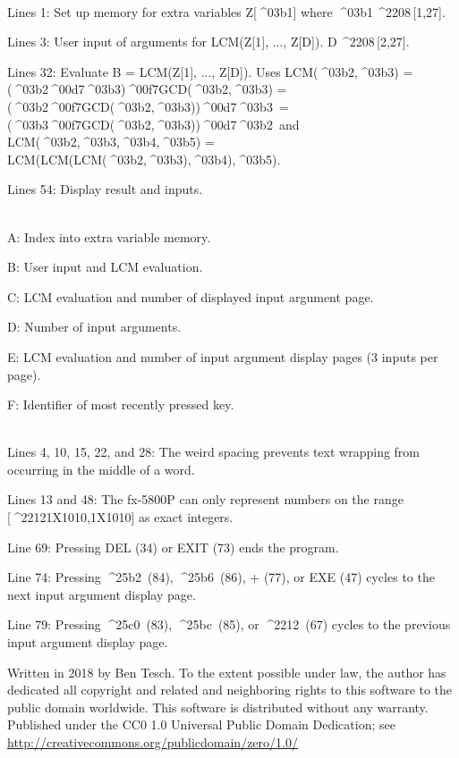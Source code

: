 \documentclass[11pt,letterpaper,twocolumn]{article}
\newcommand{\MUL}{^^^^00d7}
\newcommand{\DIV}{^^^^00f7}
\newcommand{\MINUS}{^^^^2212}
\newcommand{\EXPTEN}{{\scriptsize X10}}
\newcommand{\ELEM}{^^^^2208}
\newcommand{\ALPHA}{^^^^03b1}
\newcommand{\BETA}{^^^^03b2}
\newcommand{\GAMMA}{^^^^03b3}
\newcommand{\DELTA}{^^^^03b4}
\newcommand{\EPSILON}{^^^^03b5}
\newcommand{\UPTRIANG}{^^^^25b2}
\newcommand{\RIGHTTRIANG}{^^^^25b6}
\newcommand{\DOWNTRIANG}{^^^^25bc}
\newcommand{\LEFTTRIANG}{^^^^25c0}
\begin{document}
\\
Lines 1: Set up memory for extra variables Z[\ALPHA] where \ALPHA\,\ELEM \,[1,27].

Lines 3: User input of arguments for LCM(Z[1], ..., Z[D]). D\,\ELEM \,[2,27].

Lines 32: Evaluate B = LCM(Z[1], ..., Z[D]). Uses LCM(\BETA,\GAMMA) = (\BETA\MUL\GAMMA)\DIV GCD(\BETA,\GAMMA) = (\BETA\DIV GCD(\BETA,\GAMMA))\MUL\GAMMA ~= (\GAMMA\DIV GCD(\BETA,\GAMMA))\MUL\BETA ~and LCM(\BETA,\GAMMA,\DELTA,\EPSILON) = LCM(LCM(LCM(\BETA,\GAMMA),\DELTA),\EPSILON).

Lines 54: Display result and inputs.

\\
A: Index into extra variable memory.

B: User input and LCM evaluation.

C: LCM evaluation and number of displayed input argument page.

D: Number of input arguments.

E: LCM evaluation and number of input argument display pages (3 inputs per page).

F: Identifier of most recently pressed key.

\\
Lines 4, 10, 15, 22, and 28: The weird spacing prevents text wrapping from occurring in the middle of a word.

Lines 13 and 48: The fx-5800P can only represent numbers on the range [\MINUS 1\EXPTEN 10,1\EXPTEN 10] as exact integers.

Line 69: Pressing DEL (34) or EXIT (73) ends the program.

Line 74: Pressing \UPTRIANG ~(84), \RIGHTTRIANG ~(86), + (77), or EXE (47) cycles to the next input argument display page.

Line 79: Pressing \LEFTTRIANG ~(83), \DOWNTRIANG ~(85), or \MINUS ~(67) cycles to the previous input argument display page.

\vspace{3ex}
\scriptsize{Written in 2018 by Ben Tesch. To the extent possible under law, the author has dedicated all copyright and related and neighboring rights to this software to the public domain worldwide. This software is distributed without any warranty. Published under the CC0 1.0 Universal Public Domain Dedication; see \url{http://creativecommons.org/publicdomain/zero/1.0/}} 
\end{document}
